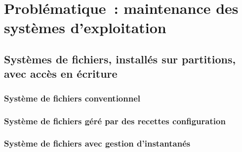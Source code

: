 




\singlespacing



\onehalfspacing







\ml
{\chapter{\todo}}
{\chapter{Problématique : maintenance des systèmes d’exploitation}}

\ml
{\section{\todo}}
{\section{Systèmes de fichiers, installés sur partitions, avec accès en écriture}}

\ml
{\subsection{\todo}}
{\subsection{Système de fichiers conventionnel}}

\ml
{\subsection{\todo}}
{\subsection{Système de fichiers géré par des recettes configuration}}

\ml
{\subsection{\todo}}
{\subsection{Système de fichiers avec gestion d’instantanés}}

